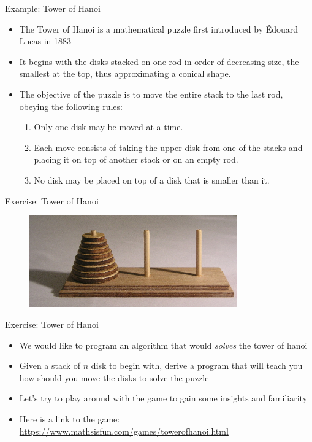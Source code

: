 \documentclass[10pt,xcolor={table,dvipsnames},t]{beamer}
\begin{document}
  
\begin{frame}{Example: Tower of Hanoi}
  \begin{itemize}
    \item The Tower of Hanoi is a mathematical puzzle first introduced by Édouard Lucas in 1883
    \item It begins with the disks stacked on one rod in order of decreasing size, the smallest at the top, thus approximating a conical shape. 
     \item The objective of the puzzle is to move the entire stack to the last rod, obeying the following rules: 
    \begin{enumerate}
      \item Only one disk may be moved at a time.
      \item Each move consists of taking the upper disk from one of the stacks and placing it on top of another stack or on an empty rod.
      \item No disk may be placed on top of a disk that is smaller than it.
    \end{enumerate}
  \end{itemize}
\end{frame}

\begin{frame}{Exercise: Tower of Hanoi}
\begin{figure}
\includegraphics[width=0.8\textwidth]{img/hanoi.jpeg}
\end{figure}
\end{frame}

\begin{frame}{Exercise: Tower of Hanoi}
\begin{itemize}
\item We would like to program an algorithm that would \textit{solves} the tower of hanoi
\item Given a stack of $n$ disk to begin with, derive a program that will teach you how should you move the disks to solve the puzzle
\item Let's try to play around with the game to gain some insights and familiarity
\item Here is a link to the game: \href{https://www.mathsisfun.com/games/towerofhanoi.html}{https://www.mathsisfun.com/games/towerofhanoi.html}
\end{itemize}
\end{frame}
\end{document}
